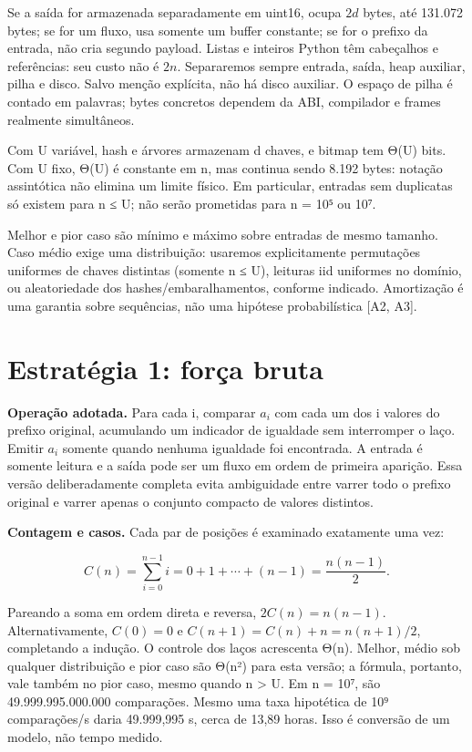\documentclass[
  brazilian,
  11pt,
  a4paper,
]{article}
\let\oldsection\section
\renewcommand{\section}{\Needspace{6\baselineskip}\oldsection}
\begin{document}
Se a saída for armazenada separadamente em uint16, ocupa \(2d\) bytes,
até 131.072 bytes; se for um fluxo, usa somente um buffer constante; se
for o prefixo da entrada, não cria segundo payload. Listas e inteiros
Python têm cabeçalhos e referências: seu custo não é \(2n\). Separaremos
sempre entrada, saída, heap auxiliar, pilha e disco. Salvo menção
explícita, não há disco auxiliar. O espaço de pilha é contado em
palavras; bytes concretos dependem da ABI, compilador e frames realmente
simultâneos.

Com U variável, hash e árvores armazenam d chaves, e bitmap tem Θ(U)
bits. Com U fixo, Θ(U) é constante em n, mas continua sendo 8.192 bytes:
notação assintótica não elimina um limite físico. Em particular,
entradas sem duplicatas só existem para n ≤ U; não serão prometidas para
n = 10⁵ ou 10⁷.

Melhor e pior caso são mínimo e máximo sobre entradas de mesmo tamanho.
Caso médio exige uma distribuição: usaremos explicitamente permutações
uniformes de chaves distintas (somente n ≤ U), leituras iid uniformes no
domínio, ou aleatoriedade dos hashes/embaralhamentos, conforme indicado.
Amortização é uma garantia sobre sequências, não uma hipótese
probabilística {[}A2, A3{]}.

\section{Estratégia 1: força
bruta}\label{estratuxe9gia-1-foruxe7a-bruta}

\textbf{Operação adotada.} Para cada i, comparar \(a_i\) com cada um dos
i valores do prefixo original, acumulando um indicador de igualdade sem
interromper o laço. Emitir \(a_i\) somente quando nenhuma igualdade foi
encontrada. A entrada é somente leitura e a saída pode ser um fluxo em
ordem de primeira aparição. Essa versão deliberadamente completa evita
ambiguidade entre varrer todo o prefixo original e varrer apenas o
conjunto compacto de valores distintos.

\textbf{Contagem e casos.} Cada par de posições é examinado exatamente
uma vez:

\[C(n)=\sum_{i=0}^{n-1}i=0+1+\cdots+(n-1)=\frac{n(n-1)}2.\]

Pareando a soma em ordem direta e reversa, \(2C(n)=n(n-1)\).
Alternativamente, \(C(0)=0\) e \(C(n+1)=C(n)+n=n(n+1)/2\), completando a
indução. O controle dos laços acrescenta Θ(n). Melhor, médio sob
qualquer distribuição e pior caso são Θ(n²) para esta versão; a fórmula,
portanto, vale também no pior caso, mesmo quando n \textgreater{} U. Em
n = 10⁷, são 49.999.995.000.000 comparações. Mesmo uma taxa hipotética
de 10⁹ comparações/s daria 49.999,995 s, cerca de 13,89 horas. Isso é
conversão de um modelo, não tempo medido.
\end{document}

